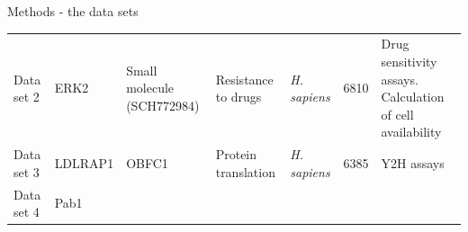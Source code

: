 \documentclass[ignorenonframetext,]{beamer}
\begin{document}
\begin{frame}{Methods - the data sets}
\begin{longtable}[]{@{}lllllll@{}}
\begin{minipage}[t]{0.05\columnwidth}
Data set 2\strut
\end{minipage} & \begin{minipage}[t]{0.04\columnwidth}\raggedright
ERK2\strut
\end{minipage} & \begin{minipage}[t]{0.14\columnwidth}\raggedright
Small molecule (SCH772984)\strut
\end{minipage} & \begin{minipage}[t]{0.12\columnwidth}\raggedright
Resistance to drugs\strut
\end{minipage} & \begin{minipage}[t]{0.08\columnwidth}\raggedright
\emph{H. sapiens}\strut
\end{minipage} & \begin{minipage}[t]{0.08\columnwidth}\raggedright
6810\strut
\end{minipage} & \begin{minipage}[t]{0.30\columnwidth}\raggedright
Drug sensitivity assays. Calculation of cell availability\strut
\end{minipage}\tabularnewline
\begin{minipage}[t]{0.05\columnwidth}\raggedright
Data set 3\strut
\end{minipage} & \begin{minipage}[t]{0.04\columnwidth}\raggedright
LDLRAP1\strut
\end{minipage} & \begin{minipage}[t]{0.14\columnwidth}\raggedright
OBFC1\strut
\end{minipage} & \begin{minipage}[t]{0.12\columnwidth}\raggedright
Protein translation\strut
\end{minipage} & \begin{minipage}[t]{0.08\columnwidth}\raggedright
\emph{H. sapiens}\strut
\end{minipage} & \begin{minipage}[t]{0.08\columnwidth}\raggedright
6385\strut
\end{minipage} & \begin{minipage}[t]{0.30\columnwidth}\raggedright
Y2H assays\strut
\end{minipage}\tabularnewline
\begin{minipage}[t]{0.05\columnwidth}\raggedright
Data set 4\strut
\end{minipage} & \begin{minipage}[t]{0.04\columnwidth}\raggedright
Pab1\strut
\end{minipage} & \begin{minipage}[t]{0.14\columnwidth}\raggedright

\end{minipage}
\end{longtable}
\end{frame}
\end{document}
